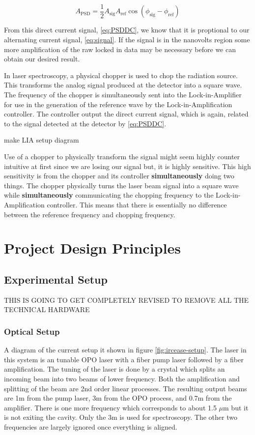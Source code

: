 \documentclass[11pt,a4paper]{book}
\begin{document}
		\begin{equation}
			\label{eq:PSDDC}
			A_{\text{PSD}} = \dfrac{1}{2} A_{\text{sig}} A_{\text{ref}} \cos(\phi_{\text{sig}} - \phi_{\text{ref}})
		\end{equation}		
		
		\noindent
		From this direct current signal, \autoref{eq:PSDDC}, we know that it is proptional to our alternating current signal, \autoref{eq:signal}. If the signal is in the nanovolts region some more amplification of the raw locked in  data may be necessary before we can obtain our desired result. \cite{LIA}
		
		In laser spectroscopy, a physical chopper is used to chop the radiation source. This transforms the analog signal produced at the detector into a square wave. The frequency of the chopper is simultaneously sent into the Lock-in-Amplifier for use in the generation of the reference wave by the Lock-in-Amplification controller. The controller output the direct current signal, which is again, related to the signal detected at the detector by \autoref{eq:PSDDC}. 
		
		make LIA setup diagram
		
		Use of a chopper to physically transform the signal might seem highly counter intuitive at first since we are losing our signal but, it is highly sensitive. This high sensitivity is from the chopper and its controller \textbf{simultaneously} doing two things. The chopper physically turns the laser beam signal into a square wave while \textbf{simultaneously} communicating the chopping frequency to the Lock-in-Amplification controller. This means that there is essentially no difference between the reference frequency and chopping frequency.

\part{Project Design Principles}
\chapter{Experimental Setup}
	THIS IS GOING TO GET COMPLETELY REVISED TO REMOVE ALL THE TECHNICAL HARDWARE
	\section{Optical Setup}
		A diagram of the current setup it shown in figure \autoref{fig:ircease-setup}.
		The laser in this system is an tunable OPO laser with a fiber pump laser followed by a fiber amplification. The tuning of the laser is done by a crystal which splits an incoming beam into two beams of lower frequency. Both the amplification and splitting  of the beam are 2nd order linear processes. 
		The resulting output beams are 1\text{$\mu$}m from the pump laser, 3\text{$\mu$}m from the OPO process, and 0.7\text{$\mu$}m from the amplifier. There is one more frequency which corresponds to about 1.5 $\mu$m but it is not exiting the cavity. Only the 3\text{$\mu$}m  is used for spectroscopy. The other two frequencies are largely ignored once everything is aligned. 
		
\end{document}
